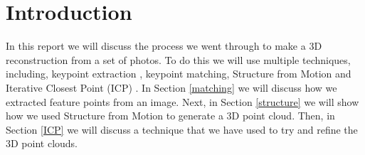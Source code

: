 \section{Introduction}
\label{intro}
In this report we will discuss the process we went through to make a 3D reconstruction from a set of photos. To do this we will use multiple techniques, including, keypoint extraction \cite{SIFT}, keypoint matching, Structure from Motion \cite{SfM} and Iterative Closest Point (ICP) \cite{ICP}.
In Section \ref{matching} we will discuss how we extracted feature points from an image. 
Next, in Section \ref{structure} we will show how we used Structure from Motion to generate a 3D point cloud. 
Then, in Section \ref{ICP} we will discuss a technique that we have used to try and refine the 3D point clouds.
